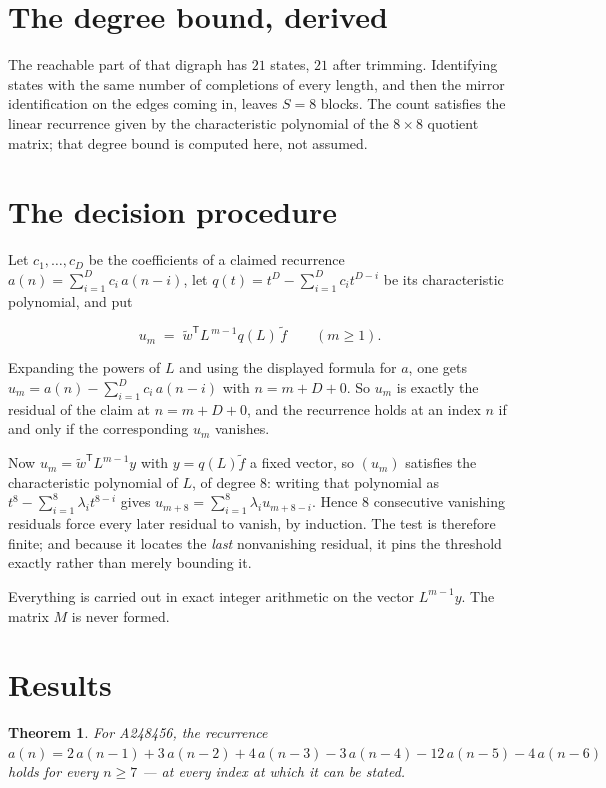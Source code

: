 \documentclass[11pt]{article}
\newtheorem{theorem}{Theorem}
\theoremstyle{definition}
\begin{document}
\section{The degree bound, derived}

The reachable part of that digraph has $21$ states, $21$ after trimming. Identifying states with the same number of completions of every length, and then the mirror identification on the edges coming in, leaves $S = 8$ blocks. The count satisfies the linear recurrence given by the characteristic polynomial of the $8\times8$ quotient matrix; that degree bound is computed here, not assumed.

\section{The decision procedure}

Let $c_1,\dots,c_D$ be the coefficients of a claimed recurrence $a(n) = \sum_{i=1}^{D} c_i\,a(n-i)$, let $q(t) = t^{D} - \sum_{i=1}^{D} c_i t^{D-i}$ be its characteristic polynomial, and put

\[u_m \;=\; \tilde w^{\mathsf T} L^{\,m-1} q(L)\,\tilde f \qquad (m \ge 1).\]

Expanding the powers of $L$ and using the displayed formula for $a$, one gets $u_m = a(n) - \sum_{i=1}^{D} c_i\,a(n-i)$ with $n = m + D + 0$. So $u_m$ is exactly the residual of the claim at $n = m + D + 0$, and the recurrence holds at an index $n$ if and only if the corresponding $u_m$ vanishes.

Now $u_m = \tilde w^{\mathsf T} L^{m-1} y$ with $y = q(L)\tilde f$ a fixed vector, so $(u_m)$ satisfies the characteristic polynomial of $L$, of degree $8$: writing that polynomial as $t^{8} - \sum_{i=1}^{8} \lambda_i t^{8-i}$ gives $u_{m+8} = \sum_{i=1}^{8} \lambda_i u_{m+8-i}$. Hence $8$ consecutive vanishing residuals force every later residual to vanish, by induction. The test is therefore finite; and because it locates the {\itshape last} nonvanishing residual, it pins the threshold exactly rather than merely bounding it.

Everything is carried out in exact integer arithmetic on the vector $L^{m-1}y$. The matrix $M$ is never formed.

\section{Results}

\begin{theorem} For A248456, the recurrence $a(n) = 2\,a(n-1) + 3\,a(n-2) + 4\,a(n-3) - 3\,a(n-4) - 12\,a(n-5) - 4\,a(n-6)$ holds for every $n \ge 7$ --- at every index at which it can be stated.\end{theorem}
\end{document}
